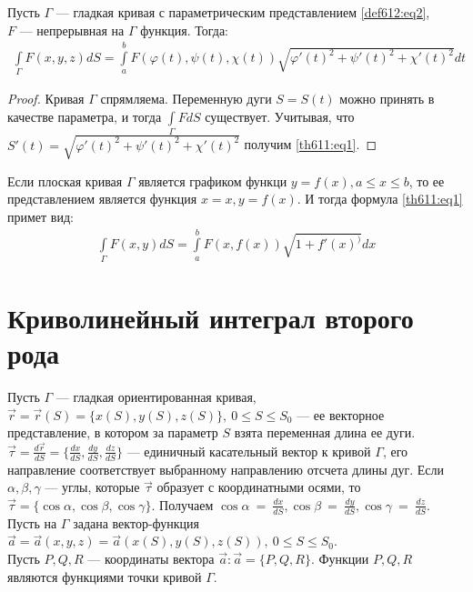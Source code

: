 \begin{theorem}
  Пусть $\Gamma$ --- гладкая кривая с параметрическим представлением
  \eqref{def612:eq2},\\ $F$ --- непрерывная на $\Gamma$ функция. Тогда:
  \begin{gather}
    \int\limits_\Gamma F(x, y, z) dS = \int\limits_a^b F(\varphi(t), \psi(t),
    \chi(t)) \sqrt{\varphi'(t)^2 + \psi'(t)^2 + \chi'(t)^2} dt
    \label{th611:eq1}
  \end{gather}
\end{theorem}

\begin{proof}
  Кривая $\Gamma$ спрямляема. Переменную дуги $S = S(t)$ можно принять в
  качестве параметра, и тогда $\int\limits_\Gamma FdS$ существует. Учитывая,
  что $S'(t) = \sqrt{\varphi'(t)^2 + \psi'(t)^2 + \chi'(t)^2}$ получим
  \eqref{th611:eq1}.
\end{proof}

\begin{remark}
  Если плоская кривая $\Gamma$ является графиком функци $y = f(x), a \leq x
  \leq b$, то ее представлением является функция $x = x, y = f(x)$. И тогда
  формула \eqref{th611:eq1} примет вид:
  \begin{gather*}
    \int\limits_\Gamma F(x, y) dS = \int\limits_a^b F(x, f(x)) \sqrt{1 +
    f'(x)^)} dx
  \end{gather*}
\end{remark}

\section{Криволинейный интеграл второго рода}

Пусть $\Gamma$ --- гладкая ориентированная кривая,\\ $\vec{r} = \vec{r}(S) =
\{x(S), y(S), z(S)\}, \ 0 \leq S \leq S_0$ --- ее векторное представление, в
котором за параметр $S$ взята переменная длина ее дуги. $\vec{\tau} =
\frac{d \vec{r}}{dS} = \{\frac{dx}{dS}, \frac{dy}{dS}, \frac{dz}{dS}\}$ ---
единичный касательный вектор к кривой $\Gamma$, его направление соответствует
выбранному направлению отсчета длины дуг. Если $\alpha, \beta, \gamma$ ---
углы, которые $\vec\tau$ образует с координатными осями, то $\vec\tau = \{\cos
\alpha, \cos \beta, \cos \gamma\}$. Получаем $\cos \alpha~=~\frac{dx}{dS}, \cos
\beta~=~\frac{dy}{dS}, \cos \gamma~=~\frac{dz}{dS}$. \\

Пусть на $\Gamma$ задана вектор-функция $\vec a = \vec a(x, y, z) = \vec
a(x(S), y(S), z(S)), \ 0 \leq S \leq S_0$. \\ Пусть $P, Q, R$ --- координаты
вектора $\vec a : \vec a = \{P, Q, R\}$. Функции $P, Q, R$ являются функциями
точки кривой $\Gamma$.

